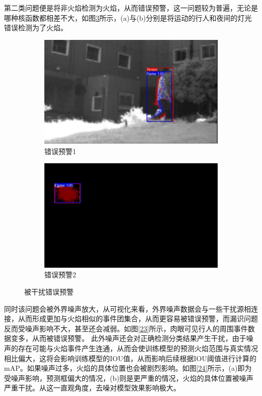 第二类问题便是将非火焰检测为火焰，从而错误预警，这一问题较为普遍，无论是哪种核函数都相差不大，如图\ref{22}所示，(a)与(b)分别是将运动的行人和夜间的灯光错误检测为了火焰。
\begin{figure}[ht]
    \centering
    \begin{subfigure}{0.49\textwidth}
        \centering
        \includegraphics[width=\textwidth]{figures/jiance4.png}
        \caption{错误预警1}
        \label{22.a}
    \end{subfigure}
    \hfill
    \begin{subfigure}{0.49\textwidth}
        \centering
        \includegraphics[width=\textwidth]{figures/jiance5.png}
        \caption{错误预警2}
        \label{22.b}
    \end{subfigure}
    \caption{被干扰错误预警}
    \label{22}
\end{figure}

同时该问题会被外界噪声放大，从可视化来看，外界噪声数据会与一些干扰源相连接，从而形成更加与火焰相似的事件团集合，从而更容易被错误预警，而漏识问题反而受噪声影响不大，甚至还会减弱。如图\ref{23}所示，肉眼可见行人的周围事件数据变多，从而被错误预警。
此外噪声还会对正确检测分类结果产生干扰，由于噪声的存在可能与火焰事件产生连通，从而会使训练模型的预测火焰范围与真实情况相比偏大，这将会影响训练模型的IOU值，从而影响后续根据IOU阈值进行计算的mAP。如果噪声过多，火焰的具体位置也会被剧烈影响。如图\ref{24}所示，(a)即为受噪声影响，预测框偏大的情况，(b)则是更严重的情况，火焰的具体位置被噪声严重干扰。从这一直观角度，去噪对模型效果影响极大。

